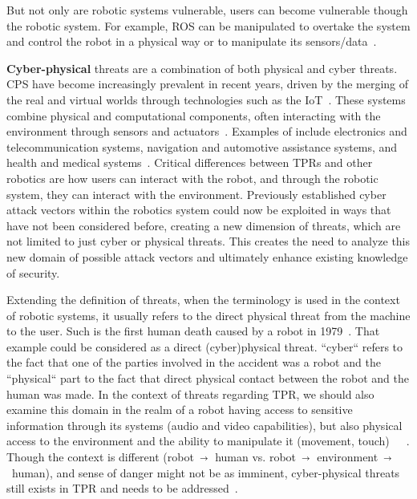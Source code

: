 But not only are robotic systems vulnerable, users can become vulnerable though the robotic system. For example, \ac{ROS} can be manipulated to overtake the system and control the robot in a physical way or to manipulate its sensors/data~\cite[]{role_of_security_in_human_robot_2017}.


\textbf{Cyber-physical} threats are a combination of both physical and cyber threats.
\ac{CPS} have become increasingly prevalent in recent years, driven by the merging of the real and virtual worlds through technologies such as
the \ac{IoT}~\cite[250]{role_of_cyber_security_in_higher_edu_2020}. These systems combine physical and computational components, often
interacting with the environment through sensors and actuators~\cite[250]{role_of_cyber_security_in_higher_edu_2020}.
Examples of  include electronics and telecommunication systems, navigation and automotive assistance systems, and health and medical systems~\cite[250]{role_of_cyber_security_in_higher_edu_2020}.
Critical differences between TPRs and other robotics are how users can interact with the robot, and through the robotic system,
they can interact with the environment. Previously established cyber attack
vectors within the robotics system could now be exploited in ways that have not been considered before, creating a new dimension of
 threats, which are not limited to just cyber or physical threats. This creates the need to analyze this new domain of
possible attack vectors and ultimately enhance existing knowledge of  security.

Extending the definition of  threats, when the terminology is used in the context of robotic systems, it usually refers to
the direct physical threat from the machine to the user. Such is the first human death caused by a robot in 1979~\cite[2]{robot_security_framework_2018}.
That example could be considered as a direct (cyber)physical threat. ``cyber`` refers to the fact that one of the parties involved in the
accident was a robot and the ``physical`` part to the fact that
direct physical contact between the robot and the human was made. In the context of  threats regarding \ac{TPR}, we should also examine this domain in
the realm of a robot having access to sensitive information through its systems (audio and video
capabilities), but also physical access to the environment and the ability to manipulate it (movement, touch)~\cite[982]{
  role_of_security_in_human_robot_2017}~\cite[250]{
  role_of_cyber_security_in_higher_edu_2020}~\cite[11]{analyzing_cyber_physical_threats_2018}.
Though the context is different (robot~$\shortrightarrow$~human vs. robot~$\shortrightarrow$~environment~$\shortrightarrow$~human), and sense of
danger might not be as imminent, cyber-physical threats
still
exists in \ac{TPR}
and
needs to
be addressed~\cite[2]{cyber_sec_safet_robots_legal_2021}.

